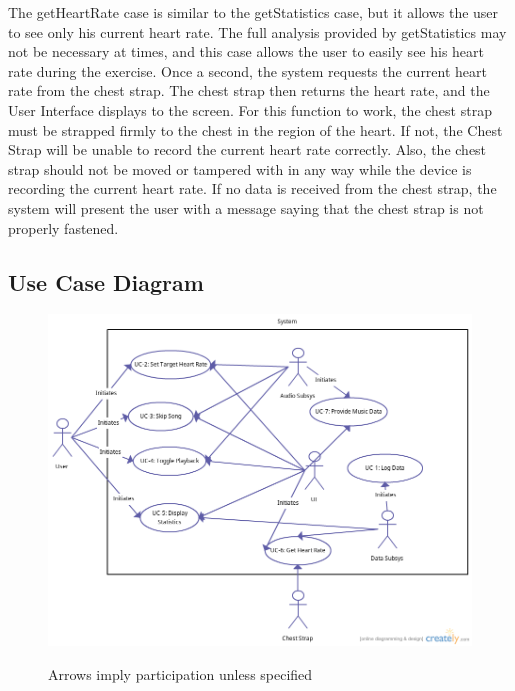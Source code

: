 \documentclass[letterpaper,english, 12pt]{scrreprt}
\begin{document}
The getHeartRate case is similar to the getStatistics case, but it allows the user to see only his current heart rate. The full analysis provided by getStatistics may not be necessary at times, and this case allows the user to easily see his heart rate during the exercise.
Once a second, the system requests the current heart rate from the chest strap. The chest strap then returns the heart rate, and the User Interface displays to the screen.
For this function to work, the chest strap must be strapped firmly to the chest in the region of the heart. If not, the Chest Strap will be unable to record the current heart rate correctly. Also, the chest strap should not be moved or tampered with in any way while the device is recording the current heart rate.
If no data is received from the chest strap, the system will present the user with a message saying that the chest strap is not properly fastened.



\subsection{Use Case Diagram}
\begin{figure}[H]
	\centering
	\includegraphics[width=\textwidth]{img/use_case.png}\\
    \caption{Arrows imply participation unless specified}
\end{figure}
\end{document}
